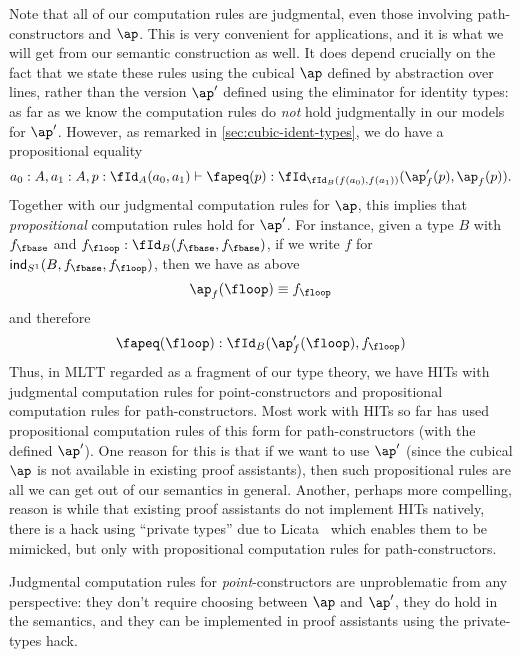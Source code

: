 \documentclass{amsart}
\begin{document}
Note that all of our computation rules are judgmental, even those involving path-constructors and $\ap$.
This is very convenient for applications, and it is what we will get from our semantic construction as well.
It does depend crucially on the fact that we state these rules using the cubical $\ap$ defined by abstraction over lines, rather than the version $\ap'$ defined using the eliminator for identity types: as far as we know the computation rules do \emph{not} hold judgmentally in our models for $\ap'$.
However, as remarked in \cref{sec:cubic-ident-types}, we do have a propositional equality
\[ \jd{a_0:A , a_1:A, p:\id[A]{a_0}{a_1}}{\fapeq(p) : \id[{\id[B]{f(a_0)}{f(a_1)}}]{\ap'_f(p)}{\ap_f(p)}}. \]
Together with our judgmental computation rules for $\ap$, this implies that \emph{propositional} computation rules hold for $\ap'$.
For instance, given a type $B$ with $f_\fbase$ and $f_\floop : \id[B]{f_\fbase}{f_\fbase}$, if we write $f$ for ${\ind{\circtype}(B,f_\fbase,f_\floop)}$, then we have as above 
\[ \ap_f(\floop) \jdeq f_\floop \]
and therefore 
\[ \fapeq(\floop) : \id[B]{\ap'_f(\floop)}{f_\floop} \]
Thus, in MLTT regarded as a fragment of our type theory, we have HITs with judgmental computation rules for point-constructors and propositional computation rules for path-constructors.
Most work with HITs so far has used propositional computation rules of this form for path-constructors (with the defined $\ap'$).
One reason for this is that if we want to use $\ap'$ (since the cubical $\ap$ is not available in existing proof assistants), then such propositional rules are all we can get out of our semantics in general.
Another, perhaps more compelling, reason is while that existing proof assistants do not implement HITs natively, there is a hack using ``private types'' due to Licata~\cite{licata:private-types} which enables them to be mimicked, but only with propositional computation rules for path-constructors.

Judgmental computation rules for \emph{point}-constructors are unproblematic from any perspective: they don't require choosing between $\ap$ and $\ap'$, they do hold in the semantics, and they can be implemented in proof assistants using the private-types hack.
\end{document}

